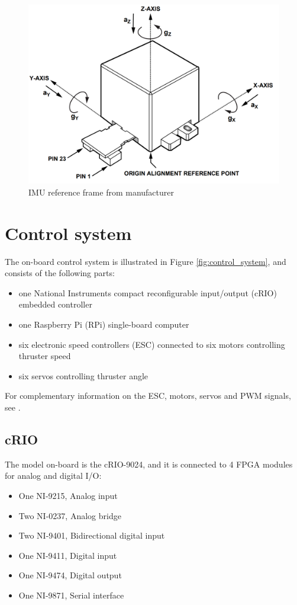 \begin{figure}[htb!]
	\centering
	\includegraphics[width=0.6\linewidth]{fig/IMU_reference_frame.png}
	\caption{IMU reference frame from manufacturer}
	\label{fig:IMU_reference_frame}
\end{figure}

\section{Control system}
The on-board control system is illustrated in Figure \ref{fig:control_system}, and consists of the following parts:
\begin{itemize}
	\item one National Instruments compact reconfigurable input/output (cRIO) embedded controller
	\item one Raspberry Pi (RPi) single-board computer
	\item six electronic speed controllers (ESC) connected to six motors controlling thruster speed
	\item six servos controlling thruster angle
\end{itemize}
For complementary information on the ESC, motors, servos and PWM signals, see \cite{bjorno2016thruster}.
\subsection{cRIO}
The model on-board is the cRIO-9024, and it is connected to 4 FPGA modules for analog and digital I/O:
\begin{itemize}
	\item One NI-9215, Analog input
	\item Two NI-0237, Analog bridge
	\item Two NI-9401, Bidirectional digital input
	\item One NI-9411, Digital input
	\item One NI-9474, Digital output
	\item One NI-9871, Serial interface
\end{itemize}
